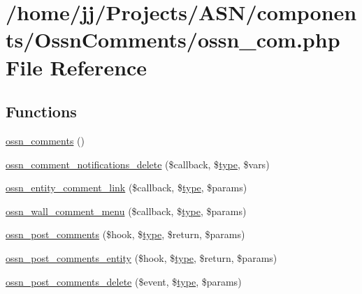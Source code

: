 \hypertarget{_ossn_comments_2ossn__com_8php}{}\section{/home/jj/\+Projects/\+A\+S\+N/components/\+Ossn\+Comments/ossn\+\_\+com.php File Reference}
\label{_ossn_comments_2ossn__com_8php}
\subsection*{Functions}
\begin{DoxyCompactItemize}
\item 
\hyperlink{_ossn_comments_2ossn__com_8php_ad41f03736c76e49b26964e60f53e494f}{ossn\+\_\+comments} ()
\item 
\hyperlink{_ossn_comments_2ossn__com_8php_a85e5ed7f0e5c347692365bc92451287c}{ossn\+\_\+comment\+\_\+notifications\+\_\+delete} (\$callback, \$\hyperlink{_ossn_wall_2actions_2wall_2post_2group_8php_a2dc1bb4e1ed0029daa81ac0776b14b51}{type}, \$vars)
\item 
\hyperlink{_ossn_comments_2ossn__com_8php_a10bc2f9abfc3b6e4a6b2a406eec21b47}{ossn\+\_\+entity\+\_\+comment\+\_\+link} (\$callback, \$\hyperlink{_ossn_wall_2actions_2wall_2post_2group_8php_a2dc1bb4e1ed0029daa81ac0776b14b51}{type}, \$params)
\item 
\hyperlink{_ossn_comments_2ossn__com_8php_af9f39383e72b2cc411340a86735cc986}{ossn\+\_\+wall\+\_\+comment\+\_\+menu} (\$callback, \$\hyperlink{_ossn_wall_2actions_2wall_2post_2group_8php_a2dc1bb4e1ed0029daa81ac0776b14b51}{type}, \$params)
\item 
\hyperlink{_ossn_comments_2ossn__com_8php_a71c892e32a49ee6ba36f82bf33ca7289}{ossn\+\_\+post\+\_\+comments} (\$hook, \$\hyperlink{_ossn_wall_2actions_2wall_2post_2group_8php_a2dc1bb4e1ed0029daa81ac0776b14b51}{type}, \$return, \$params)
\item 
\hyperlink{_ossn_comments_2ossn__com_8php_a4c91ba8d513b26e9ddb976bbafbb340d}{ossn\+\_\+post\+\_\+comments\+\_\+entity} (\$hook, \$\hyperlink{_ossn_wall_2actions_2wall_2post_2group_8php_a2dc1bb4e1ed0029daa81ac0776b14b51}{type}, \$return, \$params)
\item 
\hyperlink{_ossn_comments_2ossn__com_8php_a27453ed6ef69b94ffd82e93d728c0e15}{ossn\+\_\+post\+\_\+comments\+\_\+delete} (\$event, \$\hyperlink{_ossn_wall_2actions_2wall_2post_2group_8php_a2dc1bb4e1ed0029daa81ac0776b14b51}{type}, \$params)

\end{DoxyCompactItemize}
